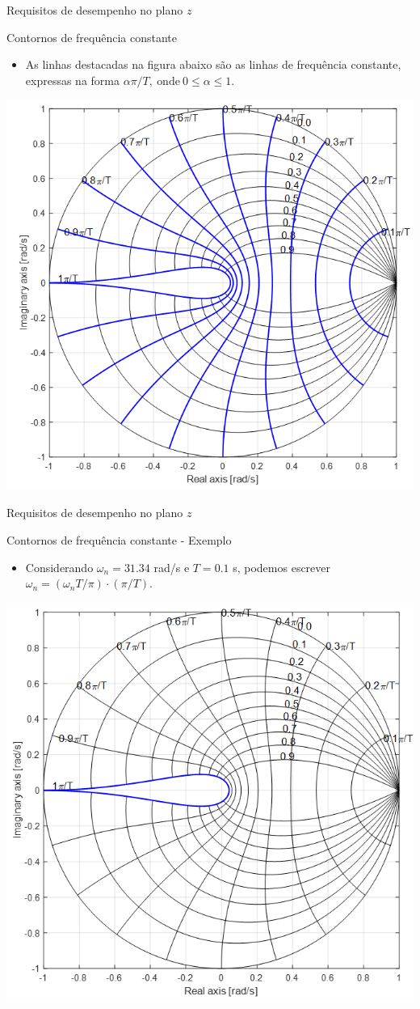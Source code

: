 \begin{frame}{Requisitos de desempenho no plano $z$}
\begin{block}{Contornos de frequência constante}
	\begin{itemize}
		\item As linhas destacadas na figura abaixo são as linhas de frequência constante, expressas na forma $\alpha \pi/T, \  \text{onde} \ 0 \leq \alpha \leq 1$.
	\end{itemize}
\end{block}
\centerline{\includegraphics[width=0.5\linewidth]{Figuras/Ch11/fig3.png}}
\end{frame}

\begin{frame}{Requisitos de desempenho no plano $z$}
\begin{block}{Contornos de frequência constante - Exemplo}
	\begin{itemize}
		\item Considerando $\omega_n = \num{31,34}$ rad/s e $T = \num{0,1}$ s, podemos escrever  $\omega_n = (\omega_nT/\pi) \cdot (\pi/T)$.
	\end{itemize}
\end{block}
\centerline{\includegraphics[width=0.5\linewidth]{Figuras/Ch11/fig4.png}}
\end{frame}

